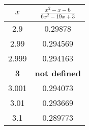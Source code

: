 \begin{tabular}{cc}
$x$ & $\frac{x^2-x-6}{6x^2-19x+3}$ \\ \hline
2.9 & 0.29878 \\
 2.99 & 0.294569 \\
 2.999 & 0.294163 \\
 \textbf{3} & \textbf{not defined}\\
 3.001 & 0.294073 \\
 3.01 & 0.293669 \\
 3.1 & 0.289773
 \end{tabular}
